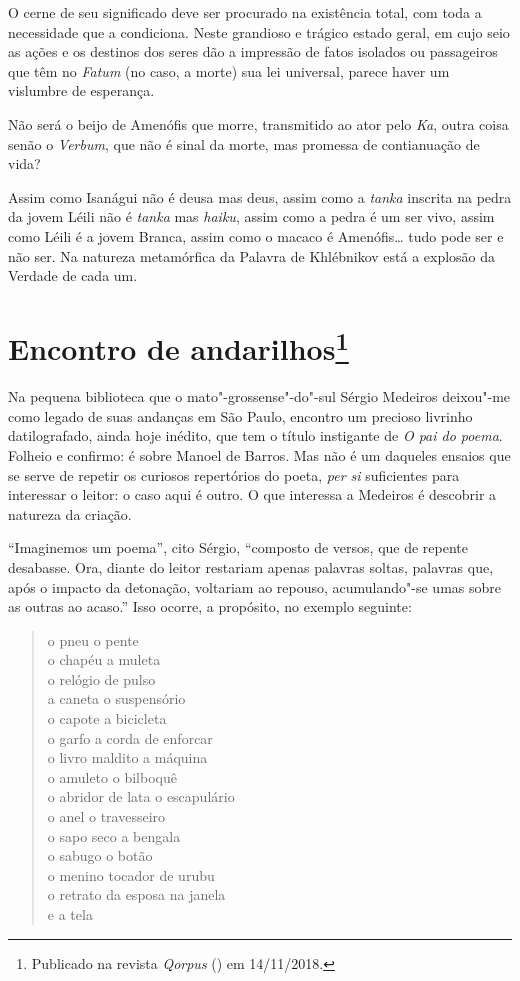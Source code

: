 O cerne de seu significado deve ser procurado na existência total,
com toda a necessidade que a condiciona. Neste grandioso e trágico
estado geral, em cujo seio as ações e os destinos dos seres dão a
impressão de fatos isolados ou passageiros que têm no \emph{Fatum}
(no caso, a morte) sua lei universal, parece haver um vislumbre de
esperança.

Não será o beijo de Amenófis que morre, transmitido ao ator pelo
\emph{Ka}, outra coisa senão o \emph{Verbum}, que não é sinal da morte,
mas promessa de contianuação de vida?

Assim como Isanágui não é deusa mas deus, assim como a \emph{tanka}
inscrita na pedra da jovem Léili não é \emph{tanka} mas \emph{haiku},
assim como a pedra é um ser vivo, assim como Léili é a jovem Branca,
assim como o macaco é Amenófis\ldots{} tudo pode ser e não ser. Na natureza
metamórfica da Palavra de Khlébnikov está a explosão da Verdade de cada
um.

\chapter{Encontro de andarilhos\footnote{Publicado na revista
  \emph{Qorpus} ({}) em 14/11/2018.}}

Na pequena biblioteca que o mato"-grossense"-do"-sul Sérgio Medeiros
deixou"-me como legado de suas andanças em São Paulo, encontro um
precioso livrinho datilografado, ainda hoje inédito, que tem o título
instigante de \emph{O pai do poema}. Folheio e confirmo: é sobre Manoel
de Barros. Mas não é um daqueles ensaios que se serve de repetir os
curiosos repertórios do poeta, \emph{per si} suficientes para interessar
o leitor: o caso aqui é outro. O que interessa a Medeiros é descobrir a
natureza da criação.

``Imaginemos um poema'', cito Sérgio, ``composto de versos, que de
repente desabasse. Ora, diante do leitor restariam apenas palavras
soltas, palavras que, após o impacto da detonação, voltariam ao repouso,
acumulando"-se umas sobre as outras ao acaso.'' Isso ocorre, a propósito,
no exemplo seguinte:

\begin{verse}
o pneu o pente \\
o chapéu a muleta \\
o relógio de pulso \\
a caneta o suspensório \\
o capote a bicicleta \\
o garfo a corda de enforcar \\
o livro maldito a máquina \\
o amuleto o bilboquê \\
o abridor de lata o escapulário \\
o anel o travesseiro \\
o sapo seco a bengala \\
o sabugo o botão \\
o menino tocador de urubu \\
o retrato da esposa na janela \\
e a tela
\end{verse}

